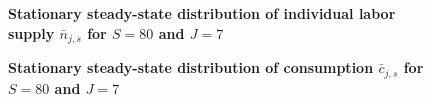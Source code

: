 \begin{spacing}{1.5}
    \begin{figure}[htb]\centering \captionsetup{width=4.0in}
      \caption{\label{FigLabSS}\textbf{Stationary steady-state distribution of individual labor supply $\bar{n}_{j,s}$ for $S=80$ and $J=7$}}
    \end{figure}

    \begin{figure}[htb]\centering \captionsetup{width=4.0in}
      \caption{\label{FigLogConsSS}\textbf{Stationary steady-state distribution of consumption $\bar{c}_{j,s}$ for $S=80$ and $J=7$}}
    \end{figure}


\end{spacing}
